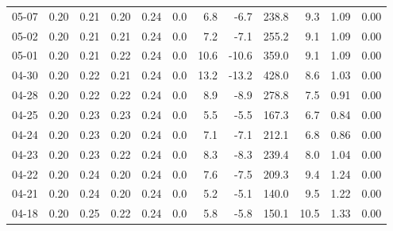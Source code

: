 \begin{threeparttable}
{\begin{tabular}{lrrrrrrrrrrr}
  05-07 &          0.20 &          0.21 &          0.20 &        0.24 &                 0.0 &                 6.8 &       -6.7 &               238.8 &              9.3 &            1.09 &                   0.00 \\
  05-02 &          0.20 &          0.21 &          0.21 &        0.24 &                 0.0 &                 7.2 &       -7.1 &               255.2 &              9.1 &            1.09 &                   0.00 \\
  05-01 &          0.20 &          0.21 &          0.22 &        0.24 &                 0.0 &                10.6 &      -10.6 &               359.0 &              9.1 &            1.09 &                   0.00 \\
  04-30 &          0.20 &          0.22 &          0.21 &        0.24 &                 0.0 &                13.2 &      -13.2 &               428.0 &              8.6 &            1.03 &                   0.00 \\
  04-28 &          0.20 &          0.22 &          0.22 &        0.24 &                 0.0 &                 8.9 &       -8.9 &               278.8 &              7.5 &            0.91 &                   0.00 \\
  04-25 &          0.20 &          0.23 &          0.23 &        0.24 &                 0.0 &                 5.5 &       -5.5 &               167.3 &              6.7 &            0.84 &                   0.00 \\
  04-24 &          0.20 &          0.23 &          0.20 &        0.24 &                 0.0 &                 7.1 &       -7.1 &               212.1 &              6.8 &            0.86 &                   0.00 \\
  04-23 &          0.20 &          0.23 &          0.22 &        0.24 &                 0.0 &                 8.3 &       -8.3 &               239.4 &              8.0 &            1.04 &                   0.00 \\
  04-22 &          0.20 &          0.24 &          0.20 &        0.24 &                 0.0 &                 7.6 &       -7.5 &               209.3 &              9.4 &            1.24 &                   0.00 \\
  04-21 &          0.20 &          0.24 &          0.20 &        0.24 &                 0.0 &                 5.2 &       -5.1 &               140.0 &              9.5 &            1.22 &                   0.00 \\
  04-18 &          0.20 &          0.25 &          0.22 &        0.24 &                 0.0 &                 5.8 &       -5.8 &               150.1 &             10.5 &            1.33 &                   0.00 \\

\end{tabular}}
\end{threeparttable}
